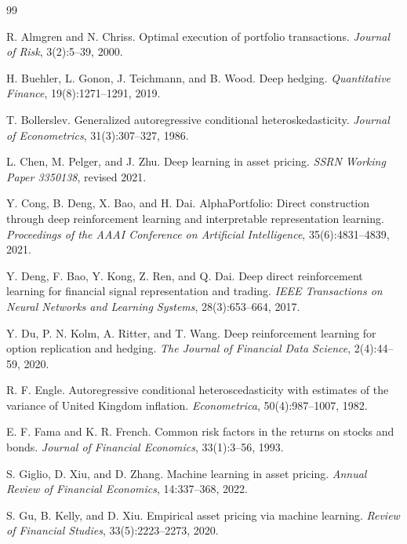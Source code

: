 \documentclass[10pt,twocolumn]{article}
\begin{document}
\begin{thebibliography}{99}

R. Almgren and N. Chriss.
\newblock Optimal execution of portfolio transactions.
\newblock \emph{Journal of Risk}, 3(2):5--39, 2000.

H. Buehler, L. Gonon, J. Teichmann, and B. Wood.
\newblock Deep hedging.
\newblock \emph{Quantitative Finance}, 19(8):1271--1291, 2019.

T. Bollerslev.
\newblock Generalized autoregressive conditional heteroskedasticity.
\newblock \emph{Journal of Econometrics}, 31(3):307--327, 1986.

L. Chen, M. Pelger, and J. Zhu.
\newblock Deep learning in asset pricing.
\newblock \emph{SSRN Working Paper 3350138}, revised 2021.

Y. Cong, B. Deng, X. Bao, and H. Dai.
\newblock AlphaPortfolio: Direct construction through deep reinforcement learning
  and interpretable representation learning.
\newblock \emph{Proceedings of the AAAI Conference on Artificial Intelligence},
  35(6):4831--4839, 2021.

Y. Deng, F. Bao, Y. Kong, Z. Ren, and Q. Dai.
\newblock Deep direct reinforcement learning for financial signal representation
  and trading.
\newblock \emph{IEEE Transactions on Neural Networks and Learning Systems},
  28(3):653--664, 2017.

Y. Du, P. N. Kolm, A. Ritter, and T. Wang.
\newblock Deep reinforcement learning for option replication and hedging.
\newblock \emph{The Journal of Financial Data Science}, 2(4):44--59, 2020.

R. F. Engle.
\newblock Autoregressive conditional heteroscedasticity with estimates of the
  variance of United Kingdom inflation.
\newblock \emph{Econometrica}, 50(4):987--1007, 1982.


E. F. Fama and K. R. French.
\newblock Common risk factors in the returns on stocks and bonds.
\newblock \emph{Journal of Financial Economics}, 33(1):3--56, 1993.

S. Giglio, D. Xiu, and D. Zhang.
\newblock Machine learning in asset pricing.
\newblock \emph{Annual Review of Financial Economics}, 14:337--368, 2022.

S. Gu, B. Kelly, and D. Xiu.
\newblock Empirical asset pricing via machine learning.
\newblock \emph{Review of Financial Studies}, 33(5):2223--2273, 2020.


\end{thebibliography}
\end{document}
